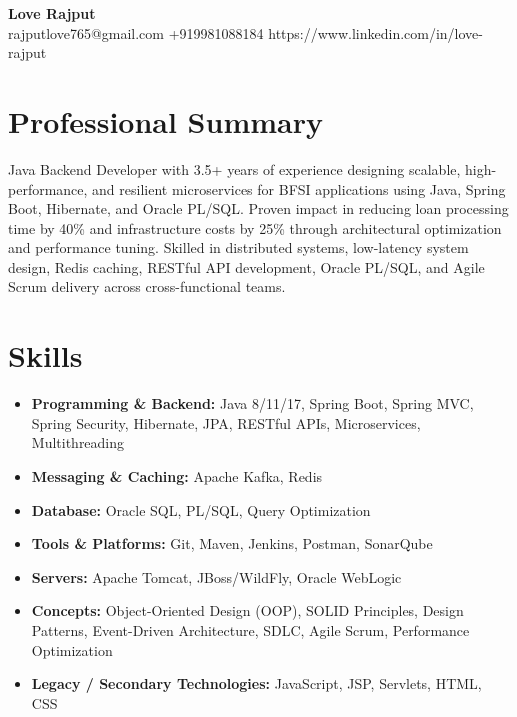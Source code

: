 \documentclass[a4paper,10pt]{article}
\begin{document}
\begin{center}
{\Huge \textbf{Love Rajput}} \\
\vspace{4pt}
{rajputlove765@gmail.com} \quad  \quad +919981088184 \quad  \quad 
{https://www.linkedin.com/in/love-rajput}
\end{center}

\vspace{-8pt}
\section*{Professional Summary}
Java Backend Developer with 3.5+ years of experience designing scalable, high-performance, and resilient microservices for BFSI applications using Java, Spring Boot, Hibernate, and Oracle PL/SQL. Proven impact in reducing loan processing time by 40\% and infrastructure costs by 25\% through architectural optimization and performance tuning. Skilled in distributed systems, low-latency system design, Redis caching, RESTful API development, Oracle PL/SQL, and Agile Scrum delivery across cross-functional teams.

\vspace{-10pt}
\section*{Skills}
\begin{itemize}[leftmargin=*]
\item \textbf{Programming \& Backend:} Java 8/11/17, Spring Boot, Spring MVC, Spring Security, Hibernate, JPA, RESTful APIs, Microservices, Multithreading
\vspace{-5pt}
\item \textbf{Messaging \& Caching:} Apache Kafka, Redis
\vspace{-5pt}
\item \textbf{Database:} Oracle SQL, PL/SQL, Query Optimization
\vspace{-5pt}
\item \textbf{Tools \& Platforms:} Git, Maven, Jenkins, Postman, SonarQube
\vspace{-5pt}
\item \textbf{Servers:} Apache Tomcat, JBoss/WildFly, Oracle WebLogic
\vspace{-5pt}
\item \textbf{Concepts:} Object-Oriented Design (OOP), SOLID Principles, Design Patterns, Event-Driven Architecture, SDLC, Agile Scrum, Performance Optimization
\vspace{-5pt}
\item \textbf{Legacy / Secondary Technologies:} JavaScript, JSP, Servlets, HTML, CSS
\end{itemize}
\end{document}

